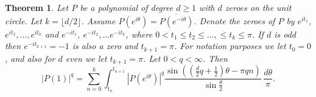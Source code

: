 \documentclass{amsart}
\theoremstyle{plain}
\newtheorem{theorem}{Theorem}
\theoremstyle{remark}
\begin{document}
	\begin{theorem}\label{thm:24analogi}
		Let $P$ be a polynomial of degree $d \geq 1$ with $d$ zeroes on the unit circle. Let $k=\lfloor d/2 \rfloor$. Assume $P(e^{i \theta})=\overline{P(e^{-i\theta})}$. Denote the zeroes of $P$ by $e^{i t_1}$, $e^{i t_2}, \dots, e^{i t_{k}}$ and $e^{-i t_1}$, $e^{-i t_2}, \dots e^{-i t_{k}}$, where $0<t_1 \leq t_2 \leq \dots, \leq t_{k} \leq \pi$. If $d$ is odd then $e^{-i t_{k+1}}=-1$ is also a zero and $t_{k+1}=\pi$. For notation purposes we let $t_0=0$, and also for $d$ even we let $t_{k+1}=\pi$. Let $0<q<\infty$. Then 
		\[|P(1)|^q=\sum_{n=0}^{k} \int_{t_n}^{t_{n+1}}|P(e^{i \theta})|^q \frac{\sin((\frac{d}{2}q+\frac{1}{2}) \theta-\pi q n)}{\sin\frac{\theta}{2}} \, \frac{d \theta}{\pi}.\]
	\end{theorem}
	
\end{document}
